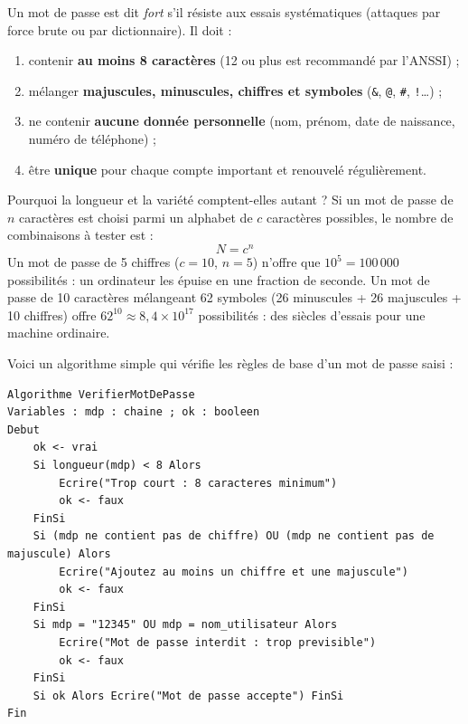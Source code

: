 \documentclass[11pt]{article}
\begin{document}
\begin{propriete}
Un mot de passe est dit \emph{fort} s'il résiste aux essais systématiques (attaques par force brute ou par dictionnaire). Il doit :
\begin{enumerate}
  \item contenir \textbf{au moins 8 caractères} (12 ou plus est recommandé par l'ANSSI) ;
  \item mélanger \textbf{majuscules, minuscules, chiffres et symboles} (\texttt{\&}, \texttt{@}, \texttt{\#}, \texttt{!}\ldots) ;
  \item ne contenir \textbf{aucune donnée personnelle} (nom, prénom, date de naissance, numéro de téléphone) ;
  \item être \textbf{unique} pour chaque compte important et renouvelé régulièrement.
\end{enumerate}
\end{propriete}

Pourquoi la longueur et la variété comptent-elles autant ? Si un mot de passe de $n$ caractères est choisi parmi un alphabet de $c$ caractères possibles, le nombre de combinaisons à tester est :
\[ N = c^{n} \]
Un mot de passe de 5 chiffres ($c = 10$, $n = 5$) n'offre que $10^{5} = 100\,000$ possibilités : un ordinateur les épuise en une fraction de seconde. Un mot de passe de 10 caractères mélangeant 62 symboles (26 minuscules + 26 majuscules + 10 chiffres) offre $62^{10} \approx 8{,}4 \times 10^{17}$ possibilités : des siècles d'essais pour une machine ordinaire.

\begin{exemplebox}
Voici un algorithme simple qui vérifie les règles de base d'un mot de passe saisi :
\begin{lstlisting}
Algorithme VerifierMotDePasse
Variables : mdp : chaine ; ok : booleen
Debut
    ok <- vrai
    Si longueur(mdp) < 8 Alors
        Ecrire("Trop court : 8 caracteres minimum")
        ok <- faux
    FinSi
    Si (mdp ne contient pas de chiffre) OU (mdp ne contient pas de majuscule) Alors
        Ecrire("Ajoutez au moins un chiffre et une majuscule")
        ok <- faux
    FinSi
    Si mdp = "12345" OU mdp = nom_utilisateur Alors
        Ecrire("Mot de passe interdit : trop previsible")
        ok <- faux
    FinSi
    Si ok Alors Ecrire("Mot de passe accepte") FinSi
Fin
\end{lstlisting}
\end{exemplebox}
\end{document}
